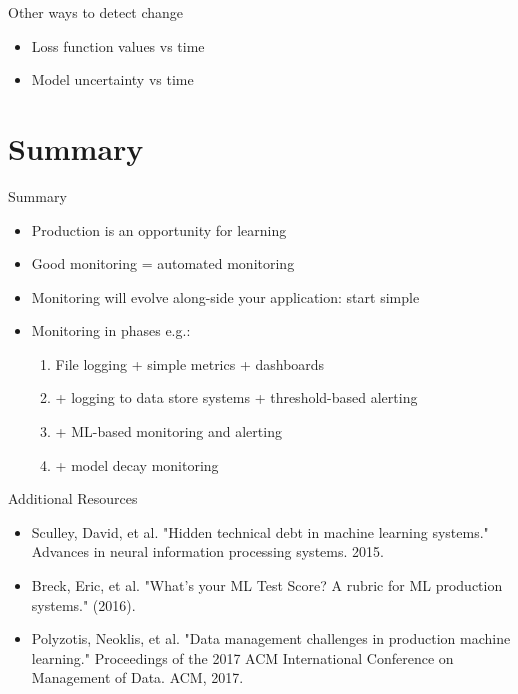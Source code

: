 \documentclass{beamer}
\begin{document}
\begin{frame}{Other ways to detect change}
	\begin{itemize}
		\item{Loss function values vs time}
		\item{Model uncertainty vs time}
	\end{itemize}
\end{frame}



\section{Summary}

\begin{frame}{Summary}
  \begin{itemize}
  \item
    Production is an opportunity for learning
  \item
  	Good monitoring = automated monitoring
  \item
    Monitoring will evolve along-side your application: start simple
  \item
    Monitoring in phases e.g.:
    \begin{enumerate}
    \item
      File logging + simple metrics + dashboards
    \item
      + logging to data store systems + threshold-based alerting
    \item 
      + ML-based monitoring and alerting
    \item
      + model decay monitoring
    \end{enumerate}
  \end{itemize}
\end{frame}

\begin{frame}{Additional Resources}
	\begin{itemize}
	\item{Sculley, David, et al. "Hidden technical debt in machine learning systems." Advances in neural information processing systems. 2015.}
	\item{Breck, Eric, et al. "What’s your ML Test Score? A rubric for ML production systems." (2016).}
	\item{Polyzotis, Neoklis, et al. "Data management challenges in production machine learning." Proceedings of the 2017 ACM International Conference on Management of Data. ACM, 2017.}
	\end{itemize}
\end{frame}
\end{document}
